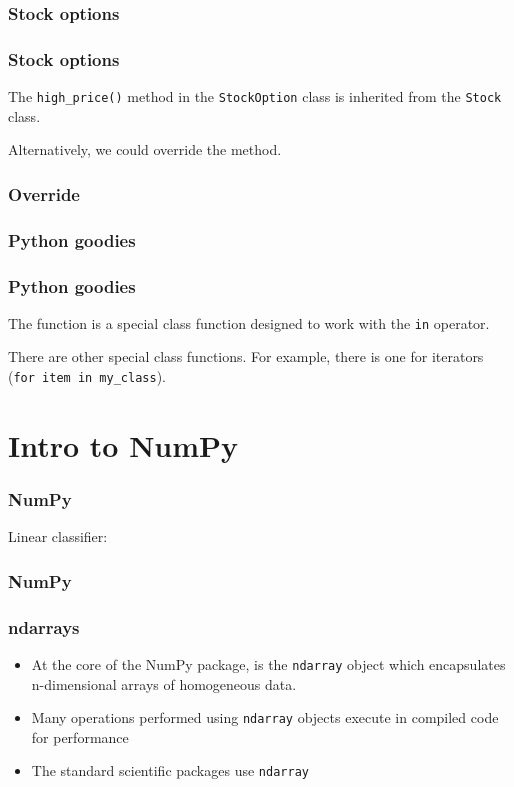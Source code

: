 \documentclass{beamer}
\begin{document}
\begin{frame}
\frametitle{Stock options}
\end{frame}

\begin{frame}
\frametitle{Stock options}
The \texttt{high\_price()} method in the \texttt{StockOption} class is inherited from the \texttt{Stock} class.

\vspace{0.2in}
Alternatively, we could override the method.
\end{frame}

\begin{frame}
\frametitle{Override}
\end{frame}

\begin{frame}
\frametitle{Python goodies}
\end{frame}

\begin{frame}
\frametitle{Python goodies}
The  function is a special class function designed to work with the \texttt{in} operator.

\vspace{0.2in}

There are other special class functions.  For example, there is one for iterators (\texttt{for item in my\_class}).

\end{frame}


\section{Intro to NumPy}

\begin{frame}
\frametitle{NumPy}
\end{frame}


\begin{frame}
Linear classifier:
\frametitle{NumPy}
\end{frame}




\begin{frame}
\frametitle{ndarrays}

\begin{itemize}
\setlength{\itemsep}{0.1in}
\item{At the core of the NumPy package, is the \texttt{ndarray} object which encapsulates n-dimensional arrays of homogeneous data. 
}
\item{Many operations performed using \texttt{ndarray} objects execute in compiled code for performance}
\item{The standard scientific packages use \texttt{ndarray}}
\end{itemize}
\end{frame}
\end{document}
